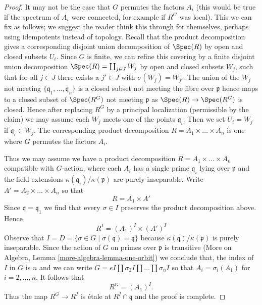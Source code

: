 \begin{proof}
\medskip\noindent
It may not be the case that $G$ permutes the factors $A_i$
(this would be true if the spectrum of $A_i$ were connected,
for example if $R^G$ was local). This we can fix as follows;
we suggest the reader think this through for themselves, perhaps
using idempotents instead of topology.
Recall that the product decomposition gives a corresponding
disjoint union decomposition of $\Spec(R)$ by open and closed
subsets $U_i$. Since $G$ is finite, we can refine this covering
by a finite disjoint union decomposition
$\Spec(R) = \coprod_{j \in J} W_j$ by open
and closed subsets $W_j$, such that for all $j \in J$ there exists
a $j' \in J$ with $\sigma(W_j) = W_{j'}$. The union of the
$W_j$ not meeting $\{\mathfrak q_1, \ldots, \mathfrak q_n\}$
is a closed subset not meeting the fibre over $\mathfrak p$
hence maps to a closed subset of $\Spec(R^G)$ not meeting
$\mathfrak p$ as $\Spec(R) \to \Spec(R^G)$ is closed.
Hence after replacing $R^G$ by a principal localization
(permissible by the claim) we may assume each $W_j$ meets
one of the points $\mathfrak q_i$. Then we set $U_i = W_j$
if $\mathfrak q_i \in W_j$. The corresponding product decomposition
$R = A_1 \times \ldots \times A_n$ is one
where $G$ permutes the factors $A_i$.

\medskip\noindent
Thus we may assume we have a product decomposition
$R = A_1 \times \ldots \times A_n$ compatible with $G$-action,
where each $A_i$ has a single prime $\mathfrak q_i$ lying
over $\mathfrak p$ and the field extensions
$\kappa(\mathfrak q_i)/\kappa(\mathfrak p)$ are purely inseparable.
Write $A' = A_2 \times \ldots \times A_n$ so that
$$
R = A_1 \times A'
$$
Since $\mathfrak q = \mathfrak q_1$ we find that every
$\sigma \in I$ preserves the product decomposition above.
Hence
$$
R^I = (A_1)^I \times (A')^I
$$
Observe that $I = D = \{\sigma \in G \mid \sigma(\mathfrak q) = \mathfrak q\}$
because $\kappa(\mathfrak q)/\kappa(\mathfrak p)$ is purely inseparable.
Since the action of $G$ on primes over $\mathfrak p$ is transitive
(More on Algebra, Lemma \ref{more-algebra-lemma-one-orbit})
we conclude that, the index of $I$ in $G$ is $n$ and we can write
$G = eI \amalg \sigma_2I \amalg \ldots \amalg \sigma_nI$ so that
$A_i = \sigma_i(A_1)$ for $i = 2, \ldots, n$. It follows that
$$
R^G = (A_1)^I.
$$
Thus the map $R^G \to R^I$ is \'etale at $R^I \cap \mathfrak q$
and the proof is complete.
\end{proof}